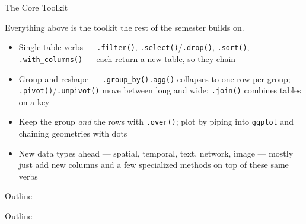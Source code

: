 \documentclass[8pt,aspectratio=169]{beamer}
\begin{document}
\begin{textframe}{The Core Toolkit}

Everything above is the toolkit the rest of the semester builds on.

\begin{itemize}
\item Single-table verbs --- \texttt{.filter()}, \texttt{.select()}/\texttt{.drop()}, \texttt{.sort()}, \texttt{.with\_columns()} --- each return a new table, so they chain
\item Group and reshape --- \texttt{.group\_by().agg()} collapses to one row per group; \texttt{.pivot()}/\texttt{.unpivot()} move between long and wide; \texttt{.join()} combines tables on a key
\item Keep the group \textit{and} the rows with \texttt{.over()}; plot by piping into \texttt{ggplot} and chaining geometries with dots
\item New data types ahead --- spatial, temporal, text, network, image --- mostly just add new columns and a few specialized methods on top of these same verbs
\end{itemize}

\end{textframe}

\begin{outlineframe}{Outline}
\end{outlineframe}

\begin{outlineframe}{Outline}
\end{outlineframe}
\end{document}
